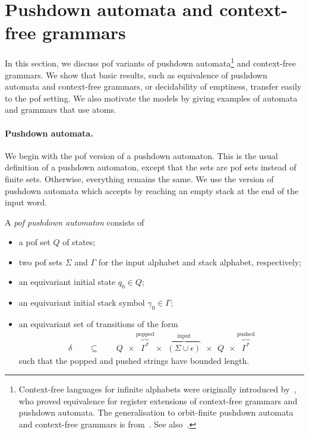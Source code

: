 \exercisepart



\section{Pushdown automata and context-free grammars}
\label{sec:cfl}
In this section, we discuss pof variants of  pushdown automata\footnote{Context-free languages for infinite alphabets were originally introduced by~\cite{DBLP:journals/acta/ChengK98}, who proved equivalence for register extensions of context-free grammars and pushdown automata. The generalisation to orbit-finite pushdown automata and context-free grammars is from~\cite{DBLP:journals/corr/BojanczykKL14}. See also~\cite{DBLP:conf/mfcs/MurawskiRT14,DBLP:conf/csl/ClementeL15,DBLP:conf/lics/ClementeL15}. } and context-free grammars.  We show that basic results, such as equivalence of pushdown automata and context-free grammars, or decidability of emptiness,  transfer easily to the pof setting. We also motivate the models by giving examples of automata and grammars that use atoms. 

 \paragraph*{Pushdown automata.} We begin with the pof version of a pushdown automaton. This is the usual definition of a pushdown automaton, except that the sets are pof sets instead of finite sets. Otherwise, everything remains the same. We use the version of pushdown automata which accepts by reaching an empty stack at the end of the input word. 
 \begin{definition}\label{def:orbit-finite-pushdown}  
	A \emph{pof pushdown automaton}  consists of 
	\begin{itemize}
		\item a pof set $Q$ of states;
		\item two pof sets $\Sigma$ and $\Gamma$ for the input alphabet and stack alphabet, respectively;
		\item an equivariant initial state $q_0 \in Q$;
		\item an equivariant initial stack symbol $\gamma_0 \in \Gamma$;
		\item an equivariant set of transitions of the form 
		\begin{align*}
			\delta \qquad \subseteq \qquad Q\ \  \times \overbrace{\Gamma^*}^{\text{popped}} \times \ \  \overbrace{(\Sigma \cup \epsilon)}^{\text{input}} \ \  \times \ \  Q\ \  \times \overbrace{\Gamma^*}^{\text{pushed}}
		\end{align*}
		such that the popped and pushed strings have bounded length.
	\end{itemize}
\end{definition}

